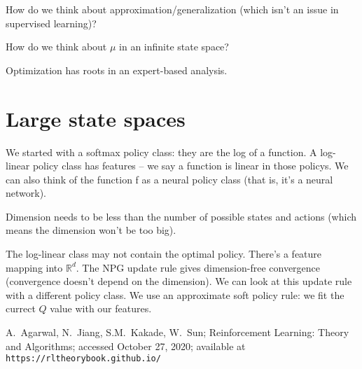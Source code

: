 \documentclass[12pt,reqno]{amsart}
\begin{document}
How do we think about approximation/generalization (which isn't an issue in supervised learning)?

How do we think about $\mu$ in an infinite state space?

Optimization has roots in an expert-based analysis.                                                                                                                                                                                                                            

\section{Large state spaces}


We started with a softmax policy class: they are the log of a function. A log-linear policy class has features -- we say a function is linear in those policys. We can also think of the function f as a neural policy class (that is, it's a neural network).

Dimension needs to be less than the number of possible states and actions (which means the dimension won't be too big).

The log-linear class may not contain the optimal policy. There's a feature mapping into $\mathbb{R}^d$. The NPG update rule gives dimension-free convergence (convergence doesn't depend on the dimension). We can look at this update rule with a different policy class. We use an approximate soft policy rule: we fit the currect $Q$ value with our features.


\begin{thebibliography}{99}

 A.\ Agarwal, N.\ Jiang, S.M.\ Kakade, W.\ Sun; Reinforcement Learning: Theory and Algorithms; accessed October 27, 2020; available at \texttt{https://rltheorybook.github.io/}
\end{thebibliography}
\end{document}
